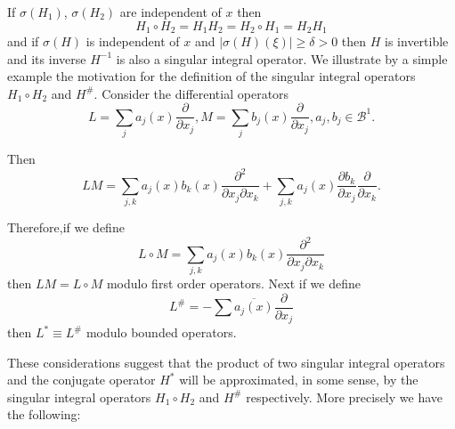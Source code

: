 \begin{theorem}\label{chap3-sec4-thm3}%
If $ \sigma (H_1)$, $\sigma (H_2)$ are independent of $x$ then 
$$
H_1 \circ H_2 = H_1 H_2 = H_2 \circ  H_1 = H_2 H_1
$$
and if $ \sigma (H)$ is independent of $x$ and $| \sigma (H) (\xi) |
\geq \delta > 0$ then $H$ is invertible and its inverse $ H^{-1}$ is
also a singular integral operator. We illustrate by a simple example
the motivation for the definition of the singular integral operators $
H_1 \circ H_2$ and  $ H^{\#}$. Consider the differential operators  
$$
L = \sum_j a_j (x) \frac{\partial}{\partial x_j}, M = \sum_j b_j (x)
\frac{\partial}{\partial x_j}, a_j, b_j \in \mathscr{B}^1. 
$$
\end{theorem}

Then 
$$
LM = \sum_{j, k} a_j(x) b_k (x) \frac{\partial^2}{\partial x_j
  \partial x_k} + \sum_{j, k} a_j (x) \frac{\partial b_k}{\partial
  x_j} \frac{\partial}{\partial x_k}. 
$$

Therefore,\pageoriginale if we define 
$$
L \circ M= \sum_{j, k} a_j (x) b_k (x) \frac{\partial^2}{\partial x_j
  \partial x_k} 
$$
then $LM = L \circ M$ modulo first order operators. Next if we define 
$$
L^{\#} = - \sum \overline{a_j (x)} \frac{\partial}{\partial x_j} 
$$
then $L^* \equiv L^{\#}$ modulo bounded operators.  

These considerations suggest that the product of two singular integral
operators and the conjugate operator $H^*$ will be approximated, in
some sense, by the singular integral operators $H_1 \circ H_2$ and $H^{\#}$
respectively. More precisely we have the following:  

